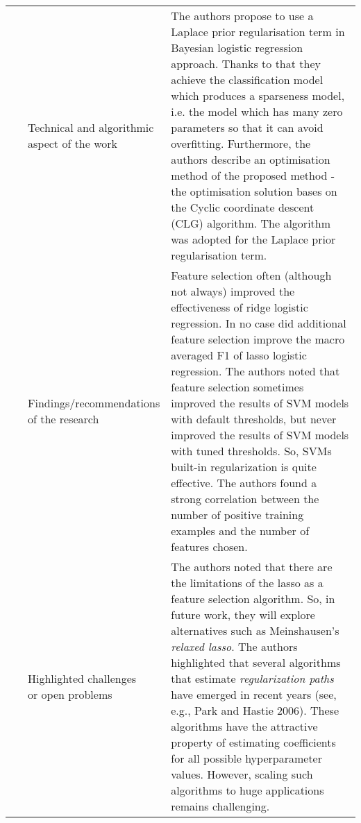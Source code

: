 \begin{landscape}
\begin{longtable}{lp{}p{}}
	\multirow{3}[0]{*}{~\citep{Genkin2007}} & 
    \specialcell{Technical and algorithmic \\ aspect of the work} &
    The authors propose to use a Laplace prior regularisation term in Bayesian logistic regression approach. Thanks to that they achieve the classification model which produces a sparseness model, i.e. the model which has many zero parameters so that it can avoid overfitting. Furthermore, the authors describe an optimisation method of the proposed method - the optimisation solution bases on the Cyclic coordinate descent (CLG) algorithm. The algorithm was adopted for the Laplace prior regularisation term.   
    \\ & 
    \specialcell{Findings/recommendations \\ of the research} & 
	Feature selection often (although not always) improved the effectiveness of ridge logistic regression. In no case did additional feature selection improve the macro averaged F1 of lasso logistic regression. The authors noted that feature selection sometimes improved the results of SVM models with default thresholds, but never improved the results of SVM models with tuned thresholds. So, SVMs built-in regularization is quite effective. The authors found a strong correlation between the number of positive training examples and the number of features chosen.
    \\ & 
    \specialcell{Highlighted challenges \\ or open problems} & 
    The authors noted that there are the limitations of the lasso as a feature selection algorithm. So, in future work, they will explore alternatives such as Meinshausen's \textit{relaxed lasso}. The authors highlighted that several algorithms that estimate \textit{regularization paths} have emerged in recent years (see, e.g., Park and Hastie 2006). These algorithms have the attractive property of estimating coefficients for all possible hyperparameter values. However, scaling such algorithms to huge applications remains challenging.
	\\
	

\end{longtable}
\end{landscape}
